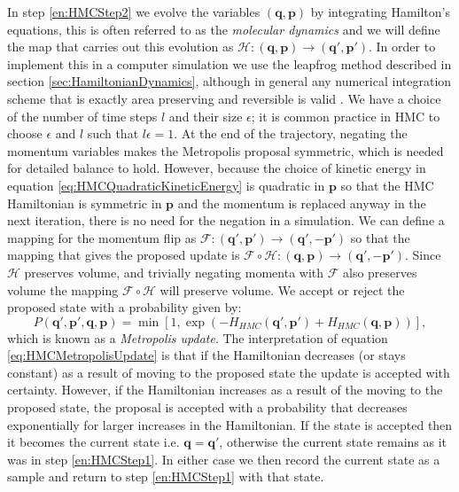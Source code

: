 \documentclass[12pt]{article}
\begin{document}
            In step \ref{en:HMCStep2} we evolve the variables $\left(\bm{q},\bm{p}\right)$ by integrating Hamilton's equations, this is often referred to as the \textit{molecular dynamics} and we will define the map that carries out this evolution as $\mathcal{H}:\left(\bm{q},\bm{p}\right)\rightarrow\left(\bm{q}',\bm{p}'\right)$. In order to implement this in a computer simulation we use the leapfrog method described in section \ref{sec:HamiltonianDynamics}, although in general any numerical integration scheme that is exactly area preserving and reversible is valid \cite{kennedy_pendleton_2001}. We have a choice of the number of time steps $l$ and their size $\epsilon$; it is common practice in HMC to choose $\epsilon$ and $l$ such that $l\epsilon=1$. At the end of the trajectory, negating the momentum variables makes the Metropolis proposal symmetric, which is needed for detailed balance to hold. However, because the choice of kinetic energy in equation \ref{eq:HMCQuadraticKineticEnergy} is quadratic in $\bm{p}$ so that the HMC Hamiltonian is symmetric in $\bm{p}$ and the momentum is replaced anyway in the next iteration, there is no need for the negation in a simulation. We can define a mapping for the momentum flip as $\mathcal{F}:\left(\bm{q}',\bm{p}'\right)\rightarrow\left(\bm{q}',-\bm{p}'\right)$ so that the mapping that gives the proposed update is $\mathcal{F}\circ \mathcal{H} : \left(\bm{q},\bm{p}\right)\rightarrow\left(\bm{q}',-\bm{p}'\right)$. Since $\mathcal{H}$ preserves volume, and trivially negating momenta with $\mathcal{F}$ also preserves volume the mapping $\mathcal{F}\circ \mathcal{H}$ will preserve volume. We accept or reject the proposed state with a probability given by:
            \begin{equation}
                \label{eq:HMCMetropolisUpdate}
                P\left(\bm{q}',\bm{p}',\bm{q},\bm{p}\right) = \min{\left[1,\exp{\left(-H_{HMC}\left(\bm{q}',\bm{p}'\right)+ \allowbreak H_{HMC}\left(\bm{q},\bm{p}\right)\right)}\right]},
            \end{equation}
            which is known as a \textit{Metropolis update}. The interpretation of equation \ref{eq:HMCMetropolisUpdate} is that if the Hamiltonian decreases (or stays constant) as a result of moving to the proposed state the update is accepted with certainty. However, if the Hamiltonian increases as a result of the moving to the proposed state, the proposal is accepted with a probability that decreases exponentially for larger increases in the Hamiltonian. If the state is accepted then it becomes the current state i.e. $\bm{q} = \bm{q}'$, otherwise the current state remains as it was in step \ref{en:HMCStep1}. In either case we then record the current state as a sample and return to step \ref{en:HMCStep1} with that state.
\end{document}
